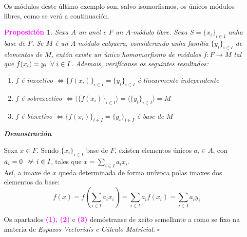 \documentclass[twoside]{report}
\newcommand{\magbf}[1]{\textcolor{magenta}{\textbf{#1}}} %
\newcommand{\almostall}{\mathrel{\vee\mkern-19mu\frown}} %
\theoremstyle{mystyle}
\newtheorem{prop}{\magbf{Proposición}}[chapter]
\newenvironment{proposition}
{\begin{mdframed}[linecolor = magenta,backgroundcolor = classicrose, linewidth = 2mm]\begin{prop}}
{\end{prop}\end{mdframed}}
\begin{document}
\vspace{3mm}

\noindent Os módulos deste último exemplo son, salvo isomorfismos, os únicos módulos libres, como se verá a continuación.\\

\begin{proposition} \label{prop3.12}
Sexa $A$ un anel e $F$ un $A$-módulo libre. Sexa $S = \{x_{i}\}_{i \in I}$ unha base de $F$. Se $M$ é un $A$-módulo calquera, considerando unha familia $\{y_{i}\}_{i \in I}$ de elementos de $M$, entón existe un único homomorfismo de módulos $f: F \longrightarrow M$ tal que $f(x_{i}) = y_{i} \hspace{2mm} \forall \hspace{1mm} i \in I$. \newline
\newline
\noindent Ademais, verifícanse os seguintes resultados:
\begin{enumerate}
    \item $f$ é inxectivo $\Longleftrightarrow \{f(x_{i})\}_{i \in I} = \{y_{i}\}_{i \in I}$ é linearmente independente
    \item $f$ é sobrexectivo $\Longleftrightarrow \langle \{f(x_{i})\}_{i \in I} \rangle = \langle \{y_{i}\}_{i \in I} \rangle = M$
    \item $f$ é bixectivo $\Longleftrightarrow \{f(x_{i})\}_{i \in I} = \{y_{i}\}_{i \in I}$ é base de $M$
\end{enumerate}
\end{proposition}

\vspace{2mm}

\noindent \textbf{\textit{\underline{Demostración}}}

\vspace{2mm}

\noindent Sexa $x \in F$. Sendo $\{x_{i}\}_{i \in I}$ base de $F$, existen elementos únicos $a_{i} \in A$, con $a_{i} = 0 \hspace{2mm} \almostall i \in I$, tales que $x = \displaystyle \sum_{i \in I} a_{i}x_{i}$.\\

\noindent Así, a imaxe de $x$ queda determinada de forma unívoca polas imaxes dos elementos da base:
$$f(x) = f \left(\displaystyle \sum_{i \in I} a_{i}x_{i}\right) = \displaystyle \sum_{i \in I} a_{i}f(x_{i}) = \displaystyle \sum_{i \in I} a_{i}y_{i}$$

\noindent Os apartados \magbf{(1)}, \magbf{(2)} e \magbf{(3)} demóstranse de xeito semellante a como se fixo na materia de \textit{Espazos Vectoriais e Cálculo Matricial}. $\square$\\
\end{document}
